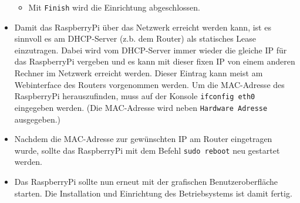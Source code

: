 \begin{itemize}
{\begin{itemize}
		\item {Mit \lstinline|Finish| wird die Einrichtung abgeschlossen.}
		\end{itemize}
		}
	\item {Damit das RaspberryPi über das Netzwerk erreicht werden kann, ist es sinnvoll es am DHCP-Server (z.b. dem Router) als statisches Lease \cite{lease} einzutragen.
		Dabei wird vom DHCP-Server immer wieder die gleiche IP für das RaspberryPi vergeben und es kann mit dieser fixen IP von einem anderen Rechner im Netzwerk erreicht werden.
		Dieser Eintrag kann meist am Webinterface des Routers vorgenommen werden.
		Um die MAC-Adresse des RaspberryPi herauszufinden, muss auf der Konsole \lstinline|ifconfig eth0| eingegeben werden.
		(Die MAC-Adresse wird neben \lstinline|Hardware Adresse| ausgegeben.)
		}
	\item {Nachdem die MAC-Adresse zur gewünschten IP am Router eingetragen wurde, sollte das RaspberryPi mit dem Befehl \lstinline|sudo reboot| neu gestartet werden.
		}
	\item {Das RaspberryPi sollte nun erneut mit der grafischen Benutzeroberfläche starten.
		Die Installation und Einrichtung des Betriebsystems ist damit fertig.
		}
\end{itemize}

